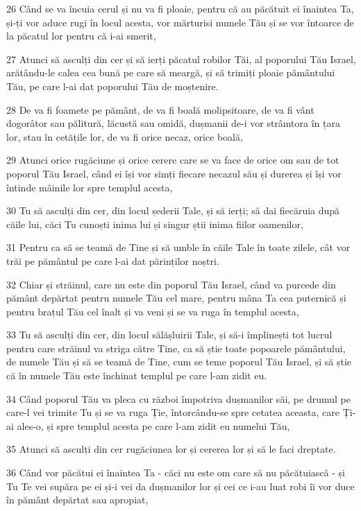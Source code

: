 \par 26 Când se va încuia cerul și nu va fi ploaie, pentru că au păcătuit ei înaintea Ta, și-ți vor aduce rugi în locul acesta, vor mărturisi numele Tău și se vor întoarce de la păcatul lor pentru că i-ai smerit,
\par 27 Atunci să asculți din cer și să ierți păcatul robilor Tăi, al poporului Tău Israel, arătându-le calea cea bună pe care să meargă, și să trimiți ploaie pământului Tău, pe care l-ai dat poporului Tău de moștenire.
\par 28 De va fi foamete pe pământ, de va fi boală molipsitoare, de va fi vânt dogorâtor sau pălitură, lăcustă sau omidă, dușmanii de-i vor strâmtora în țara lor, stau în cetățile lor, de va fi orice necaz, orice boală,
\par 29 Atunci orice rugăciune și orice cerere care se va face de orice om sau de tot poporul Tău Israel, când ei își vor simți fiecare necazul său și durerea și își vor întinde mâinile lor spre templul acesta,
\par 30 Tu să asculți din cer, din locul șederii Tale, și să ierți; să dai fiecăruia după căile lui, căci Tu cunoști inima lui și singur știi inima fiilor oamenilor,
\par 31 Pentru ca să se teamă de Tine și să umble în căile Tale în toate zilele, cât vor trăi pe pământul pe care l-ai dat părinților noștri.
\par 32 Chiar și străinul, care nu este din poporul Tău Israel, când va purcede din pământ depărtat pentru numele Tău cel mare, pentru mâna Ta cea puternică și pentru brațul Tău cel înalt și va veni și se va ruga în templul acesta,
\par 33 Tu să asculți din cer, din locul sălășluirii Tale, și să-i împlinești tot lucrul pentru care străinul va striga către Tine, ca să știe toate popoarele pământului, de numele Tău și să se teamă de Tine, cum se teme poporul Tău Israel, și să știe că în numele Tău este închinat templul pe care l-am zidit eu.
\par 34 Când poporul Tău va pleca cu război împotriva dușmanilor săi, pe drumul pe care-l vei trimite Tu și se va ruga Ție, întorcându-se spre cetatea aceasta, care Ți-ai ales-o, și spre templul acesta pe care l-am zidit eu numelui Tău,
\par 35 Atunci să asculți din cer rugăciunea lor și cererea lor și să le faci dreptate.
\par 36 Când vor păcătui ei înaintea Ta - căci nu este om care să nu păcătuiască - și Tu Te vei supăra pe ei și-i vei da dușmanilor lor și cei ce i-au luat robi îi vor duce în pământ depărtat sau apropiat,
